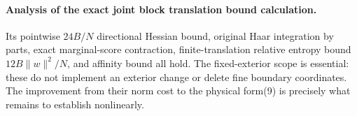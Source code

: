 \documentclass[11pt]{article}
\begin{document}
\paragraph{Analysis of the exact joint block translation bound calculation.}
Its pointwise $24B/N$ directional Hessian bound, original Haar integration by
parts, exact marginal-score contraction, finite-translation relative entropy
bound $12B\|w\|^2/N$, and affinity bound all hold. The fixed-exterior scope is
essential: these do not implement an exterior change or delete fine boundary
coordinates. The improvement from their norm cost to the physical form(9) is
precisely what remains to establish nonlinearly.
\end{document}
